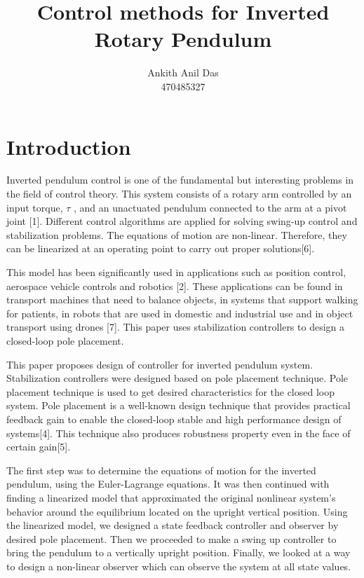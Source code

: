 \documentclass[superscriptaddress,floatfix,reprint,amssymb, amsmath,aps, pre]{revtex4-1}
\begin{document}
{
    \title{Control methods for Inverted Rotary Pendulum}
    \author{Ankith Anil Das\\
    470485327}

    \maketitle

    \section{Introduction}{
        Inverted pendulum control is one of the fundamental but interesting problems in the field of control theory. This system consists of a rotary arm controlled by an input torque, \(\tau\) , and an unactuated pendulum connected to the arm at a pivot joint [1]. Different control algorithms are applied for solving swing-up control and stabilization problems. The equations of motion are non-linear. Therefore, they can be linearized at an operating point to carry out proper solutions[6]. 

        This model has been significantly used in applications such as position control, aerospace vehicle controls and robotics [2]. These applications can be found in transport machines that need to balance objects, in systems that support walking for patients, in robots that are used in domestic and industrial use and in object transport using drones [7]. This paper uses stabilization controllers to design a closed-loop pole placement. 

        This paper proposes design of controller for inverted pendulum system. Stabilization controllers were designed based on pole placement technique. Pole placement technique is used to get desired characteristics for the closed loop system. Pole placement is a well-known design technique that provides practical feedback gain to enable the closed-loop stable and high performance design of systems[4]. This technique also produces robustness property even in the face of certain gain[5].

        The first step was to determine the equations of motion for the inverted pendulum, using the Euler-Lagrange equations. It was then continued with finding a linearized model that approximated the original nonlinear system’s behavior around the equilibrium located on the upright vertical position. Using the linearized model, we designed a state feedback controller and observer by desired pole placement. Then we proceeded to make a swing up controller to bring the pendulum to a vertically upright position. Finally, we looked at a way to design a non-linear observer which can observe the system at all state values. 
    }
}
\end{document}
